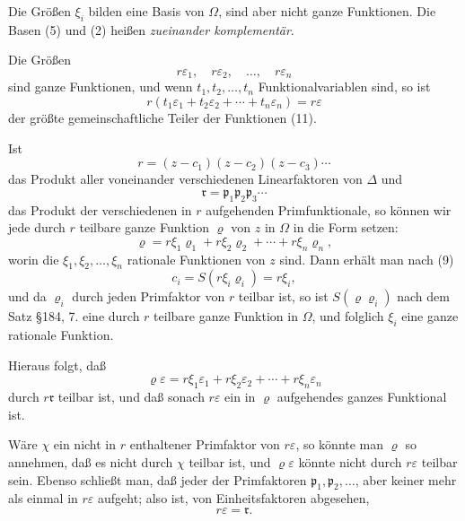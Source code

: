 \documentclass[12pt,a4paper]{article}
\begin{document}
Die Größen $\xi_i$ bilden eine Basis von $\Omega$, sind aber nicht ganze Funktionen. Die Basen (5) und (2) heißen \emph{zueinander komplementär}.

Die Größen
\begin{equation}\label{eq:198-11}
r\varepsilon_1, \quad r\varepsilon_2, \quad \ldots, \quad r\varepsilon_n
\end{equation}
sind ganze Funktionen, und wenn $t_1, t_2, \ldots, t_n$ Funktionalvariablen sind, so ist
\begin{equation}\label{eq:198-12}
r(t_1\varepsilon_1 + t_2\varepsilon_2 + \cdots + t_n\varepsilon_n) = r\varepsilon
\end{equation}
der größte gemeinschaftliche Teiler der Funktionen (11).

Ist
\begin{equation}\label{eq:198-13}
r = (z - c_1)(z - c_2)(z - c_3) \cdots
\end{equation}
das Produkt aller voneinander verschiedenen Linearfaktoren von $\Delta$ und
\begin{equation}\label{eq:198-14}
\mathfrak{r} = \mathfrak{p}_1 \mathfrak{p}_2 \mathfrak{p}_3 \cdots
\end{equation}
das Produkt der verschiedenen in $r$ aufgehenden Primfunktionale, so können wir jede durch $r$ teilbare ganze Funktion $\varrho$ von $z$ in $\Omega$ in die Form setzen:
\[
\varrho = r\xi_1\varrho_1 + r\xi_2\varrho_2 + \cdots + r\xi_n\varrho_n,
\]
worin die $\xi_1, \xi_2, \ldots, \xi_n$ rationale Funktionen von $z$ sind. Dann erhält man nach (9)
\[
c_i = S(r\xi_i \varrho_i) = r\xi_i,
\]
und da $\varrho_i$ durch jeden Primfaktor von $r$ teilbar ist, so ist $S(\varrho \varrho_i)$ nach dem Satz \S 184, 7. eine durch $r$ teilbare ganze Funktion in $\Omega$, und folglich $\xi_i$ eine ganze rationale Funktion.

Hieraus folgt, daß
\[
\varrho\varepsilon = r\xi_1\varepsilon_1 + r\xi_2\varepsilon_2 + \cdots + r\xi_n\varepsilon_n
\]
durch $r\mathfrak{r}$ teilbar ist, und daß sonach $r\varepsilon$ ein in $\varrho$ aufgehendes ganzes Funktional ist.

Wäre $\chi$ ein nicht in $r$ enthaltener Primfaktor von $r\varepsilon$, so könnte man $\varrho$ so annehmen, daß es nicht durch $\chi$ teilbar ist, und $\varrho\varepsilon$ könnte nicht durch $r\varepsilon$ teilbar sein. Ebenso schließt man, daß jeder der Primfaktoren $\mathfrak{p}_1, \mathfrak{p}_2, \ldots$, aber keiner mehr als einmal in $r\varepsilon$ aufgeht; also ist, von Einheitsfaktoren abgesehen,
\begin{equation}\label{eq:198-15}
r\varepsilon = \mathfrak{r}.
\end{equation}
\end{document}
